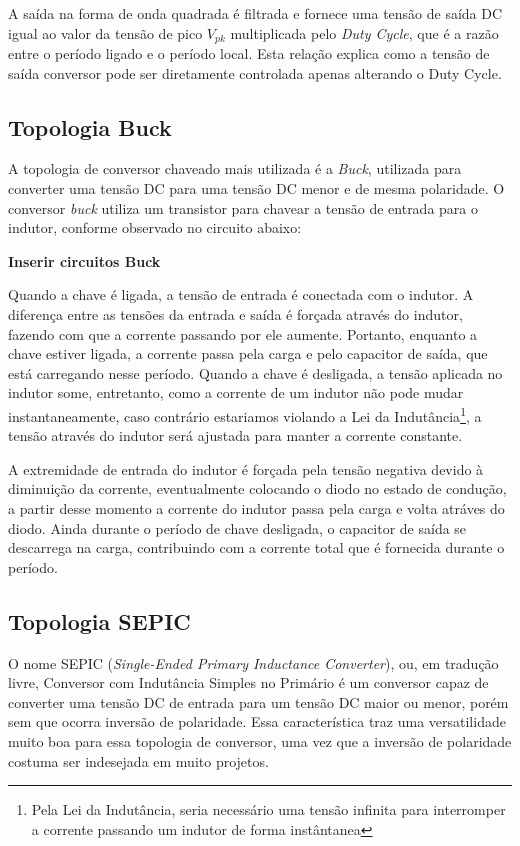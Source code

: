 A saída na forma de onda quadrada é filtrada e fornece uma tensão de saída DC igual ao valor da tensão de pico $V_{pk}$ multiplicada pelo \textit{Duty Cycle}, que é a razão entre o período ligado e o período local. Esta relação explica como a tensão de saída conversor pode ser diretamente controlada apenas alterando o Duty Cycle.  

\subsection*{Topologia Buck}
A topologia de conversor chaveado mais utilizada é a \textit{Buck}, utilizada para converter uma tensão DC para uma tensão DC menor e de mesma polaridade. O conversor \textit{buck} utiliza um transistor para chavear a tensão de entrada para o indutor, conforme observado no circuito abaixo:

\textbf{ Inserir circuitos Buck }

Quando a chave é ligada, a tensão de entrada é conectada com o indutor. A diferença entre as tensões da entrada e saída é forçada através do indutor, fazendo com que a corrente passando por ele aumente. Portanto, enquanto a chave estiver ligada, a corrente passa pela carga e pelo capacitor de saída, que está carregando nesse período. Quando a chave é desligada, a tensão aplicada no indutor some, entretanto, como a corrente de um indutor não pode mudar instantaneamente, caso contrário estariamos violando a Lei da Indutância\footnote{Pela Lei da Indutância, seria necessário uma tensão infinita para interromper a corrente passando um indutor de forma instântanea}, a tensão através do indutor será ajustada para manter a corrente constante.

A extremidade de entrada do indutor é forçada pela tensão negativa devido à diminuição da corrente, eventualmente colocando o diodo no estado de condução, a partir desse momento a corrente do indutor passa pela carga e volta atráves do diodo. Ainda durante o período de chave desligada, o capacitor de saída se descarrega na carga, contribuindo com a corrente total que é fornecida durante o período. 


\subsection*{Topologia SEPIC}
O nome SEPIC (\textit{Single-Ended Primary Inductance Converter}), ou, em tradução livre, Conversor com Indutância Simples no Primário é um conversor capaz de converter uma tensão DC de entrada para um tensão DC maior ou menor, porém sem que ocorra inversão de polaridade. Essa característica traz uma versatilidade muito boa para essa topologia de conversor, uma vez que a inversão de polaridade costuma ser indesejada em muito projetos. 

